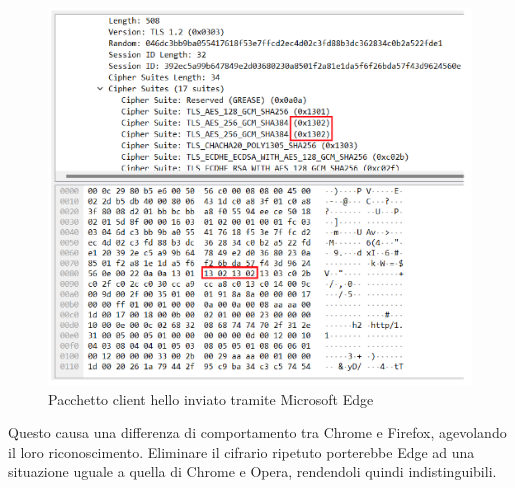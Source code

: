 \begin{figure}[h]
	\centering
	\includegraphics[width=\textwidth]{figures/cifrario_ripetuto.png}
	\caption{Pacchetto client hello inviato tramite Microsoft Edge}
	\label{cifrario_ripetuto}
\end{figure}

Questo causa una differenza di comportamento tra Chrome e Firefox, agevolando il loro riconoscimento. Eliminare il cifrario ripetuto porterebbe Edge ad una situazione uguale a quella di Chrome e Opera, rendendoli quindi indistinguibili.



 








